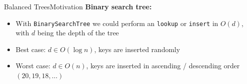 

\begin{frame}{Balanced Trees}{Motivation}
  \textbf{Binary search tree:}
  \begin{itemize}
  \item<2->
    With \texttt{\color{MainA}BinarySearchTree} we could perform an
    \texttt{\color{MainA}lookup} or \texttt{\color{MainA}insert}
    in {\color{MainA}$O(d)$}, with {\color{MainA}$d$} being the
    {\color{MainA}depth} of the tree
  \item<3->
    Best case: {\color{MainA}$d \in O(\log n)$}, keys are inserted randomly
  \item<4->
    Worst case: {\color{MainA}$d \in O(n)$}, keys are inserted in
    ascending / descending order {\color{MainA}$(20, 19, 18, \dotsc)$}
  \end{itemize}
\end{frame}


